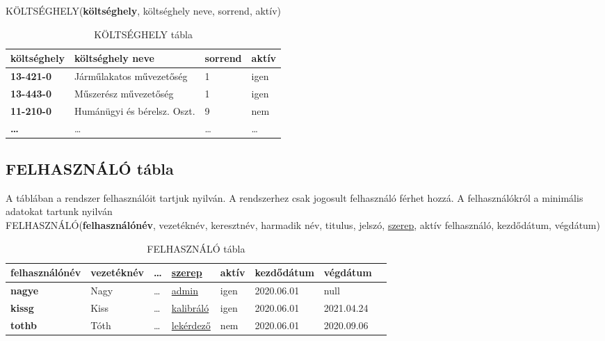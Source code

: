 \documentclass[a4paper,12pt]{report}
\newcommand{\pk}[1]{\textbf{#1}} %
\newcommand{\fk}[1]{\underline{#1}} %
\newcommand{\tabla}[1]{\noindent\MakeUppercase{#1}} %
\begin{document}
\tabla{KÖLTSÉGHELY}(\pk{költséghely}, költséghely neve, sorrend, aktív)


\begin{table}[ht!]
\centering
	\begin{footnotesize}
\begin{tabular}[t]{|l|l|l|l|}
\hline
 \textbf{költséghely}&költséghely neve&sorrend&aktív\\ \hline
 \textbf{13-421-0}&Járműlakatos művezetőség&1&igen\\
 \textbf{13-443-0}&Műszerész művezetőség&1&igen\\
 \textbf{11-210-0}&Humánügyi és bérelsz. Oszt.&9&nem\\
 \textbf{\dots}&\dots&\dots&\dots \\
\end{tabular}
\end{footnotesize}
\caption{KÖLTSÉGHELY tábla} \label{tabKOLTSEGHELY}
\end{table}


\subsection{FELHASZNÁLÓ tábla}
A táblában a rendszer felhasználóit tartjuk nyilván. A rendszerhez csak 
jogosult felhasználó férhet hozzá. A felhasználókról a minimális adatokat 
tartunk nyilván\\

\tabla{felhasználó}(\pk{felhasználónév}, vezetéknév, keresztnév, 
harmadik név, titulus, jelszó, \fk{szerep}, aktív felhasználó, kezdődátum, végdátum)


\begin{table}[ht!]
 \centering
 \begin{footnotesize}
 \begin{tabular}[t]{|l|l|l|l|l|l|l|l|}
  \hline
\textbf{felhasználónév}&vezetéknév&\dots&\fk{szerep}
&aktív&kezdődátum&végdátum\\ \hline
  \textbf{nagye}&Nagy&\dots&\fk{admin}&igen&2020.06.01&null \\
  \textbf{kissg}&Kiss&\dots&\fk{kalibráló}&igen&2020.06.01&2021.04.24\\
  \textbf{tothb}&Tóth&\dots&\fk{lekérdező}&nem&2020.06.01&2020.09.06\\
 \end{tabular}
\end{footnotesize}
\caption{FELHASZNÁLÓ tábla}\label{tabFEHASZNALO}
\end{table}
\end{document}
